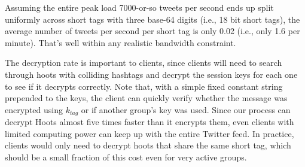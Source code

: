 Assuming the entire peak load 7000-or-so tweets per second ends up split
uniformly across short tags with three base-64 digits (i.e., 18 bit
short tags), the average number of tweets per second per short tag is
only 0.02 (i.e., only 1.6 \msgs per minute). That's well within any
realistic bandwidth constraint.




The decryption rate is important to clients, since clients will need to
search through hoots with colliding hashtags and decrypt the session
keys for each one to see if it decrypts correctly. Note that, with a
simple fixed constant string prepended to the keys, the client can
quickly verify whether the message was encrypted using $k_{tag}$ or if
another group's key was used. Since our process can decrypt Hoots almost
five times faster than it encrypts them, even clients with limited
computing power can keep up with the entire Twitter feed. In practice,
clients would only need to decrypt hoots that share the same short tag,
which should be a small fraction of this cost even for very active
groups.




\fi
